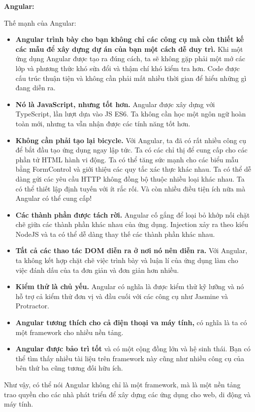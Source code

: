 \textbf{Angular:}

Thế mạnh của Angular:
\begin{itemize}
    \item \textbf{Angular trình bày cho bạn không chỉ các công cụ mà còn thiết kế các mẫu để xây dựng dự án của bạn một cách dễ duy trì.} Khi một ứng dụng Angular được tạo ra đúng cách, ta sẽ không gặp phải một mớ các lớp và phương thức khó sửa đổi và thậm chí khó kiểm tra hơn. Code được cấu trúc thuận tiện và không cần phải mất nhiều thời gian để hiểu những gì đang diễn ra.
    \item \textbf{Nó là JavaScript, nhưng tốt hơn.} Angular được xây dựng với TypeScript, lần lượt dựa vào JS ES6. Ta không cần học một ngôn ngữ hoàn toàn mới, nhưng ta vẫn nhận được các tính năng tốt hơn.
    \item \textbf{Không cần phải tạo lại bicycle.} Với Angular, ta đã có rất nhiều công cụ để bắt đầu tạo ứng dụng ngay lập tức. Ta có các chỉ thị để cung cấp cho các phần tử HTML hành vi động. Ta có thể tăng sức mạnh cho các biểu mẫu bằng FormControl và giới thiệu các quy tắc xác thực khác nhau. Ta có thể dễ dàng gửi các yêu cầu HTTP không đồng bộ thuộc nhiều loại khác nhau. Ta có thể thiết lập định tuyến với ít rắc rối. Và còn nhiều điều tiện ích nữa mà Angular có thể cung cấp!
    \item \textbf{Các thành phần được tách rời.} Angular cố gắng để loại bỏ khớp nối chặt chẽ giữa các thành phần khác nhau của ứng dụng. Injection xảy ra theo kiểu NodeJS và ta có thể dễ dàng thay thế các thành phần khác nhau.
    \item \textbf{Tất cả các thao tác DOM diễn ra ở nơi nó nên diễn ra.} Với Angular, ta không kết hợp chặt chẽ việc trình bày và luận lí của ứng dụng làm cho việc đánh dấu của ta đơn giản và đơn giản hơn nhiều.
    \item \textbf{Kiểm thử là chủ yếu.} Angular có nghĩa là được kiểm thử kỹ lưỡng và nó hỗ trợ cả kiểm thử đơn vị và đầu cuối với các công cụ như Jasmine và Protractor.
    \item \textbf{Angular tương thích cho cả điện thoại va máy tính,} có nghĩa là ta có một framework cho nhiều nền tảng.
    \item \textbf{Angular được bảo trì tốt} và có một cộng đồng lớn và hệ sinh thái. Bạn có thể tìm thấy nhiều tài liệu trên framework này cũng như nhiều công cụ của bên thứ ba cũng tương đối hữu ích.
\end{itemize}

Như vậy, có thể nói Angular không chỉ là một framework, mà là một nền tảng trao quyền cho các nhà phát triển để xây dựng các ứng dụng cho web, di động và máy tính.

